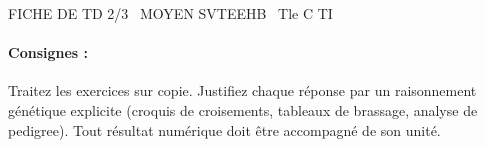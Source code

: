 \documentclass[11pt]{article}
\begin{document}
\begin{tcolorbox}[enhanced,colback=popink,colframe=popink,arc=10pt,boxrule=0pt,left=12pt,right=12pt,top=9pt,bottom=9pt]
{\color{white}\popxbold\small FICHE DE TD 2/3 \textbullet\ MOYEN \hfill SVTEEHB \textbullet\ Tle C TI\par}
\end{tcolorbox}
\vspace{4pt}
\paragraph{Consignes :} Traitez les exercices sur copie. Justifiez chaque réponse par un raisonnement génétique explicite (croquis de croisements, tableaux de brassage, analyse de pedigree). Tout résultat numérique doit être accompagné de son unité.
\end{document}

